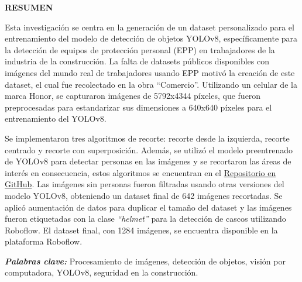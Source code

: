 \thispagestyle{plain}

\newpage

\begin{center}
  \textbf{RESUMEN}
\end{center}

\vspace{1cm}

Esta investigación se centra en la generación de un dataset personalizado para el entrenamiento del modelo de detección de objetos YOLOv8, específicamente para la detección de equipos de protección personal (EPP) en trabajadores de la industria de la construcción. La falta de datasets públicos disponibles con imágenes del mundo real de trabajadores usando EPP motivó la creación de este dataset, el cual fue recolectado en la obra ``Comercio''. Utilizando un celular  de la marca Honor, se capturaron imágenes de 5792x4344 píxeles, que fueron preprocesadas para estandarizar sus dimensiones a 640x640 píxeles para el entrenamiento del YOLOv8.

Se implementaron tres algoritmos de recorte: recorte desde la izquierda, recorte centrado y recorte con superposición. Además, se utilizó el modelo preentrenado de YOLOv8 para detectar personas en las imágenes y se recortaron las áreas de interés en consecuencia, estos algoritmos se encuentran en el \href{https://github.com/Aleticod/yolo_image_preprocessing}{Repositorio en GitHub}. Las imágenes sin personas fueron filtradas usando otras versiones del modelo YOLOv8, obteniendo un dataset final de 642 imágenes recortadas. Se aplicó aumentación de datos para duplicar el tamaño del dataset y las imágenes fueron etiquetadas con la clase \textit{``helmet''}  para la detección de cascos utilizando Roboflow. El dataset final, con 1284 imágenes, se encuentra disponible en la plataforma Roboflow.

\textit{\textbf{Palabras clave:}} Procesamiento de imágenes, detección de objetos, visión por computadora, YOLOv8, seguridad en la construcción.

\vfill

\pagebreak